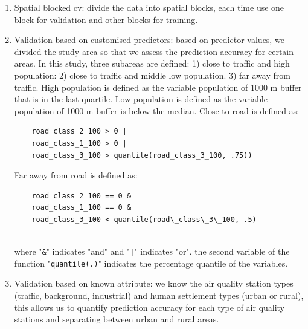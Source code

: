 \documentclass{article}
\begin{document}
\begin{itemize}
\begin{enumerate}
    \item Spatial blocked cv: divide the data into spatial blocks, each time use one block for validation and other blocks for training. 
    \item Validation based on customised predictors: based on predictor values, we divided the study area so that we assess the prediction accuracy for certain areas. In this study, three subareas are defined:  1) close to traffic and high population:  
    2) close to traffic and middle low population. 3) far away from traffic. High population is defined as the variable population of 1000 m buffer that is in the last quartile. Low population is defined as the variable population of 1000 m buffer is below the median. Close to road is defined as: 
    \begin{lstlisting} 
    road_class_2_100 > 0 | 
    road_class_1_100 > 0 |
    road_class_3_100 > quantile(road_class_3_100, .75)) \end{lstlisting}
    Far away from road is defined as:
  \begin{lstlisting} 
    road_class_2_100 == 0 &
    road_class_1_100 == 0 & 
    road_class_3_100 < quantile(road\_class\_3\_100, .5)
    
    \end{lstlisting}
    where "{\tt \&}" indicates "and" and "{\tt |}" indicates "or". the second variable of the function "{\tt quantile(.)}" indicates the percentage quantile of the variables. 
   
    \item Validation based on known attribute: we know the air quality station types (traffic, background, industrial) and human settlement types (urban or rural), this allows us to quantify prediction accuracy for each type of air quality stations and separating between urban and rural areas. 
\end{enumerate}



\end{itemize}
 
\end{document}
